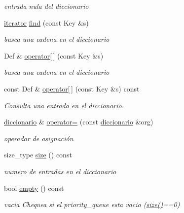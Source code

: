 \begin{DoxyCompactItemize}
\begin{DoxyCompactList}\small\item\em entrada nula del diccionario \end{DoxyCompactList}\item 
\hyperlink{classdiccionario_1_1iterator}{iterator} \hyperlink{classdiccionario_af2d4a60ea376fa3aeb46c993a6184419}{find} (const Key \&s)
\begin{DoxyCompactList}\small\item\em busca una cadena en el diccionario \end{DoxyCompactList}\item 
Def \& \hyperlink{classdiccionario_affedc5c8b077e6779cd349a434582a6f}{operator\mbox{[}$\,$\mbox{]}} (const Key \&s)
\begin{DoxyCompactList}\small\item\em busca una cadena en el diccionario \end{DoxyCompactList}\item 
const Def \& \hyperlink{classdiccionario_a0ef2ff66bfb8ac71042d016ca8b3f7a8}{operator\mbox{[}$\,$\mbox{]}} (const Key \&s) const 
\begin{DoxyCompactList}\small\item\em Consulta una entrada en el diccionario. \end{DoxyCompactList}\item 
\hyperlink{classdiccionario}{diccionario} \& \hyperlink{classdiccionario_a48db160684851f90efec8b9d91a8a041}{operator=} (const \hyperlink{classdiccionario}{diccionario} \&org)
\begin{DoxyCompactList}\small\item\em operador de asignación \end{DoxyCompactList}\item 
size\-\_\-type \hyperlink{classdiccionario_a47ab5f44b87c4346e49713ab77126931}{size} () const 
\begin{DoxyCompactList}\small\item\em numero de entradas en el diccionario \end{DoxyCompactList}\item 
\hypertarget{classdiccionario_a90be88011567664ed276eb887f6cad96}{bool \hyperlink{classdiccionario_a90be88011567664ed276eb887f6cad96}{empty} () const }\label{classdiccionario_a90be88011567664ed276eb887f6cad96}

\begin{DoxyCompactList}\small\item\em vacia Chequea si el priority\-\_\-queue esta vacio (\hyperlink{classdiccionario_a47ab5f44b87c4346e49713ab77126931}{size()}==0) \end{DoxyCompactList}\end{DoxyCompactItemize}
